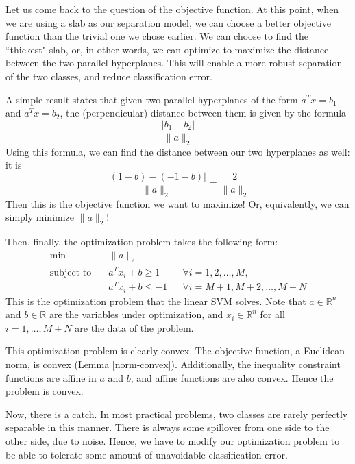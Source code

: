 \documentclass[a4paper]{article}
\theoremstyle{definition}
\begin{document}
Let us come back to the question of the objective function.
At this point, when we are using a slab as our separation model, we can choose a better objective function than the trivial one we chose earlier.
We can choose to find the ``thickest" slab, or, in other words, we can optimize to maximize the distance between the two parallel hyperplanes.
This will enable a more robust separation of the two classes, and reduce classification error.

A simple result states that given two parallel hyperplanes of the form $a^T x = b_1$ and $a^T x = b_2$, the (perpendicular) distance between them is given by the formula
\begin{equation*}
	\frac{| b_1 - b_2 |}{\| a \|_2}
\end{equation*}
Using this formula, we can find the distance between our two hyperplanes as well: it is
\begin{equation*}
	\frac{| (1 - b) - (-1 - b) |}{\| a \|_2} = \frac{2}{\| a \|_2}
\end{equation*}
Then this is the objective function we want to maximize!
Or, equivalently, we can simply minimize $\| a \|_2$!

Then, finally, the optimization problem takes the following form:
\begin{equation}
	\label{hard-linear-svm}
	\begin{aligned}
		\min \quad & \| a \|_2 \\
		\text{subject to} \quad & a^T x_i + b \geq 1 && \forall i = 1, 2, \dots, M, \\
		& a^T x_i + b \leq -1 && \forall i = M{+}1, M{+}2, \dots, M{+}N
	\end{aligned}
\end{equation}
This is the optimization problem that the linear SVM solves.
Note that $a \in \mathbb{R}^n$ and $b \in \mathbb{R}$ are the variables under optimization, and $x_i \in \mathbb{R}^n$ for all $i = 1, \dots, M{+}N$ are the data of the problem.

This optimization problem is clearly convex.
The objective function, a Euclidean norm, is convex (Lemma \ref{norm-convex}).
Additionally, the inequality constraint functions are affine in $a$ and $b$, and affine functions are also convex.
Hence the problem is convex.

Now, there is a catch.
In most practical problems, two classes are rarely perfectly separable in this manner.
There is always some spillover from one side to the other side, due to noise.
Hence, we have to modify our optimization problem to be able to tolerate some amount of unavoidable classification error.
\end{document}
